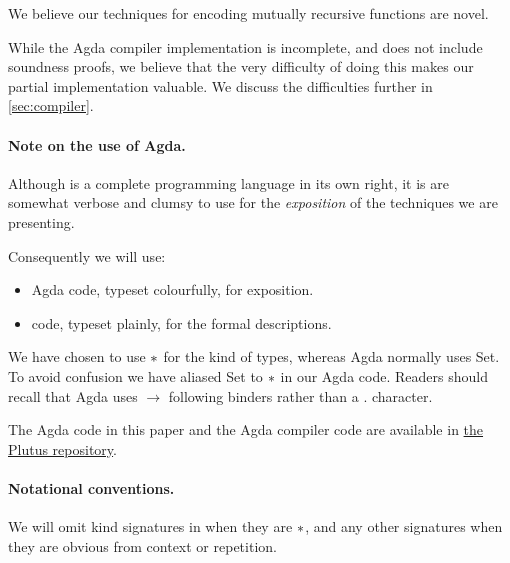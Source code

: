 We believe our techniques for encoding mutually recursive functions are novel.

While the Agda compiler implementation is incomplete, and does not include soundness
proofs, we believe that the very difficulty of doing this makes our partial
implementation valuable. We discuss the difficulties further in \cref{sec:compiler}.

\paragraph{Note on the use of Agda.}

Although \FOMF{} is a complete programming language in its own
right, it is are somewhat verbose and clumsy to use for the \emph{exposition} of the
techniques we are presenting.

Consequently we will use:
\begin{itemize}
  \item Agda code, typeset colourfully, for exposition.
  \item \FOMF{} code, typeset plainly, for the formal descriptions.
\end{itemize}

We have chosen to use $\operatorname{\ast}$ for the kind of types, whereas Agda normally
uses Set. To avoid confusion we have aliased Set to $\operatorname{\ast}$ in our Agda code.
Readers should recall that Agda uses $\rightarrow$ following binders rather than
a $.$ character.

The Agda code in this paper and the Agda compiler code are available in
\href{\sourceUrl}{the Plutus repository}.

\paragraph{Notational conventions.}

We will omit kind signatures in \FOMF{} when they are $\operatorname{\ast}$, and any other signatures when
they are obvious from context or repetition.

